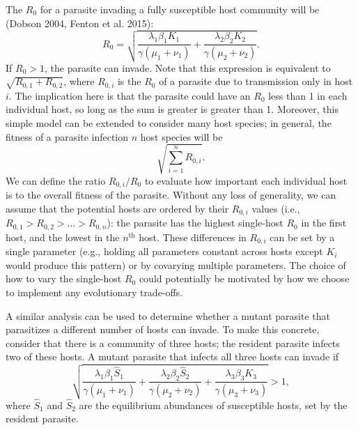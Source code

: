 \documentclass[11pt,reqno,final,pdftex]{amsart}\usepackage[]{graphicx}\usepackage[]{color}
\theoremstyle{plain}
\numberwithin{equation}{part}
\begin{document}
The $R_0$ for a parasite invading a fully susceptible host community will be (Dobson 2004, Fenton et al. 2015):
\begin{equation}
R_0 = \sqrt{\frac{\lambda_1 \beta_1 K_1}{\gamma(\mu_1 + \nu_1)} + \frac{\lambda_2 \beta_2 K_2}{\gamma(\mu_2 + \nu_2)}}.
\end{equation}
If $R_0 > 1$, the parasite can invade.
Note that this expression is equivalent to $\sqrt{R_{0,1} + R_{0,2}}$, where $R_{0,i}$ is the $R_0$ of a parasite due to transmission only in host $i$.
The implication here is that the parasite could have an $R_0$ less than 1 in each individual host, so long as the sum is greater is greater than 1.
Moreover, this simple model can be extended to consider many host species; in general, the fitness of a parasite infection $n$ host species will be
\begin{equation}
\sqrt{\sum_{i=1}^n R_{0,i}}.
\end{equation}
We can define the ratio $R_{0,i}/R_0$ to evaluate how important each individual host is to the overall fitness of the parasite.
Without any loss of generality, we can assume that the potential hosts are ordered by their $R_{0,i}$ values (i.e., $R_{0,1} > R_{0,2} > \dots > R_{0,n}$): the parasite has the highest single-host $R_0$ in the first host, and the lowest in the $n^{\text{th}}$ host.
These differences in $R_{0,i}$ can be set by a single parameter (e.g., holding all parameters constant across hosts except $K_i$ would produce this pattern) or by covarying multiple parameters.
The choice of how to vary the single-host $R_0$ could potentially be motivated by how we choose to implement any evolutionary trade-offs.

A similar analysis can be used to determine whether a mutant parasite that parasitizes a different number of hosts can invade.
To make this concrete, consider that there is a community of three hosts; the resident parasite infects two of these hosts.
A mutant parasite that infects all three hosts can invade if
\begin{equation}\label{eq:invasion}
\sqrt{\frac{\lambda_1 \beta_1 \hat{S}_1}{\gamma(\mu_1 + \nu_1)} + \frac{\lambda_2 \beta_2 \hat{S}_2}{\gamma(\mu_2 + \nu_2)} + \frac{\lambda_3 \beta_3 K_3}{\gamma(\mu_3 + \nu_3)}} > 1,
\end{equation}
where $\hat{S}_1$ and $\hat{S}_2$ are the equilibrium abundances of susceptible hosts, set by the resident parasite.
\end{document}
